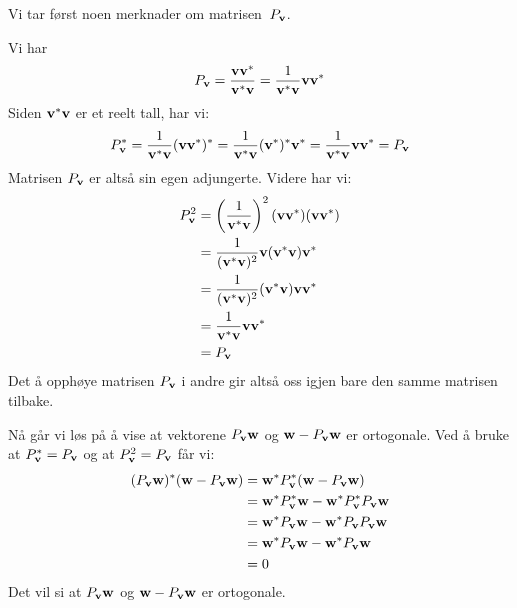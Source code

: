 \begin{losning}
Vi tar først noen merknader om matrisen~$P_\v$.

Vi har
\[
P_\v
= \frac{\v \v^*}{\v^* \v}
= \frac{1}{\v^* \v} \v \v^*
\]
Siden $\v^* \v$ er et reelt tall, har vi:
\[
P_\v^*
= \frac{1}{\v^* \v} (\v \v^*)^*
= \frac{1}{\v^* \v} (\v^*)^* \v^*
= \frac{1}{\v^* \v} \v \v^*
= P_\v
\]
Matrisen $P_\v$ er altså sin egen adjungerte.  Videre har vi:
\begin{align*}
P_\v^2
&= \left(\frac{1}{\v^* \v}\right)^2 (\v \v^*) (\v \v^*) \\
&= \frac{1}{(\v^* \v)^2} \v (\v^* \v) \v^* \\
&= \frac{1}{(\v^* \v)^2} (\v^* \v) \v \v^* \\
&= \frac{1}{\v^* \v} \v \v^* \\
&= P_\v
\end{align*}
Det å opphøye matrisen $P_\v$ i andre gir altså oss igjen bare den
samme matrisen tilbake.

Nå går vi løs på å vise at vektorene $P_\v \w$ og $\w - P_\v \w$ er
ortogonale.  Ved å bruke at $P_\v^* = P_\v$ og at $P_\v^2 = P_\v$ får
vi:
\begin{align*}
(P_\v \w)^* (\w - P_\v \w)
&= \w^* P_\v^* (\w - P_\v \w) \\
&= \w^* P_\v^* \w - \w^* P_\v^* P_\v \w \\
&= \w^* P_\v \w - \w^* P_\v P_\v \w \\
&= \w^* P_\v \w - \w^* P_\v \w \\
&= 0
\end{align*}
Det vil si at $P_\v \w$ og $\w - P_\v \w$ er ortogonale.
\end{losning}


%
%


